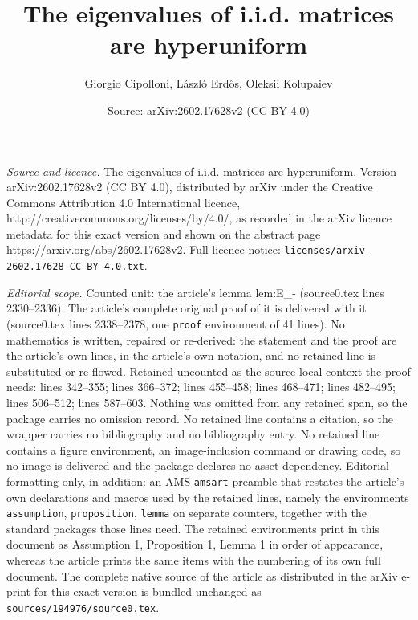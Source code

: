 \documentclass[10pt,a4paper]{amsart}
\title{The eigenvalues of i.i.d. matrices are hyperuniform}
\author{Giorgio Cipolloni, L\'aszl\'o Erd\H{o}s, Oleksii Kolupaiev}
\date{Source: arXiv:2602.17628v2 (CC BY 4.0)}
\begin{document}
\maketitle

\noindent\emph{Source and licence.} The eigenvalues of i.i.d. matrices are hyperuniform. Version arXiv:2602.17628v2 (CC BY 4.0), distributed by arXiv under the Creative Commons Attribution 4.0 International licence, http://creativecommons.org/licenses/by/4.0/, as recorded in the arXiv licence metadata for this exact version and shown on the abstract page https://arxiv.org/abs/2602.17628v2. Full licence notice: \texttt{licenses/arxiv-2602.17628-CC-BY-4.0.txt}.\par\smallskip

\noindent\textit{Editorial scope.} Counted unit: the article's lemma lem:E\_- (source0.tex lines 2330--2336). The article's complete original proof of it is delivered with it (source0.tex lines 2338--2378, one \texttt{proof} environment of 41 lines). No mathematics is written, repaired or re-derived: the statement and the proof are the article's own lines, in the article's own notation, and no retained line is substituted or re-flowed.  Retained uncounted as the source-local context the proof needs: lines 342--355; lines 366--372; lines 455--458; lines 468--471; lines 482--495; lines 506--512; lines 587--603.  Nothing was omitted from any retained span, so the package carries no omission record.  No retained line contains a citation, so the wrapper carries no bibliography and no bibliography entry.  No retained line contains a figure environment, an image-inclusion command or drawing code, so no image is delivered and the package declares no asset dependency.  Editorial formatting only, in addition: an AMS \texttt{amsart} preamble that restates the article's own declarations and macros used by the retained lines, namely the environments \texttt{assumption}, \texttt{proposition}, \texttt{lemma} on separate counters, together with the standard packages those lines need.  The retained environments print in this document as Assumption 1, Proposition 1, Lemma 1 in order of appearance, whereas the article prints the same items with the numbering of its own full document.  The complete native source of the article as distributed in the arXiv e-print for this exact version is bundled unchanged as \texttt{sources/194976/source0.tex}.
\end{document}
